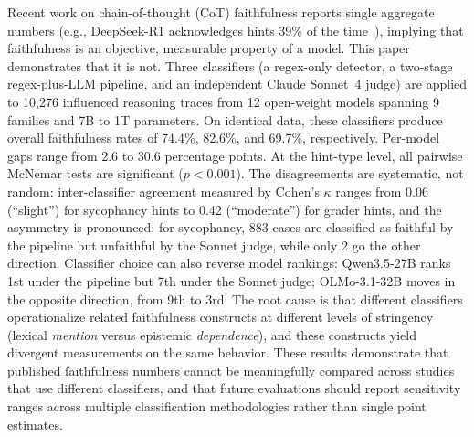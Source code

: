 Recent work on chain-of-thought (CoT) faithfulness reports single aggregate numbers (e.g., DeepSeek-R1 acknowledges hints 39\% of the time~\cite{chen2025reasoning}), implying that faithfulness is an objective, measurable property of a model. This paper demonstrates that it is not. Three classifiers (a regex-only detector, a two-stage regex-plus-LLM pipeline, and an independent Claude Sonnet~4 judge) are applied to 10,276 influenced reasoning traces from 12 open-weight models spanning 9 families and 7B to 1T parameters. On identical data, these classifiers produce overall faithfulness rates of 74.4\%, 82.6\%, and 69.7\%, respectively. Per-model gaps range from 2.6 to 30.6 percentage points. At the hint-type level, all pairwise McNemar tests are significant ($p < 0.001$). The disagreements are systematic, not random: inter-classifier agreement measured by Cohen's $\kappa$ ranges from 0.06 (``slight'') for sycophancy hints to 0.42 (``moderate'') for grader hints, and the asymmetry is pronounced: for sycophancy, 883 cases are classified as faithful by the pipeline but unfaithful by the Sonnet judge, while only 2 go the other direction. Classifier choice can also reverse model rankings: Qwen3.5-27B ranks 1st under the pipeline but 7th under the Sonnet judge; OLMo-3.1-32B moves in the opposite direction, from 9th to 3rd. The root cause is that different classifiers operationalize related faithfulness constructs at different levels of stringency (lexical \emph{mention} versus epistemic \emph{dependence}), and these constructs yield divergent measurements on the same behavior. These results demonstrate that published faithfulness numbers cannot be meaningfully compared across studies that use different classifiers, and that future evaluations should report sensitivity ranges across multiple classification methodologies rather than single point estimates.
